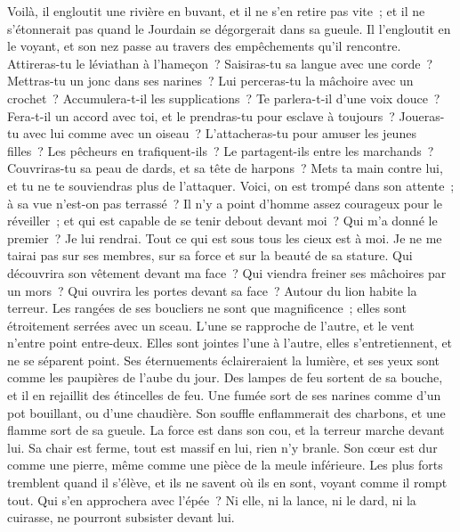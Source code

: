 \begin{multicols}{2}
Voilà, il engloutit une rivière en buvant, et il ne s'en retire pas vite~; et il ne s'étonnerait pas quand le Jourdain se dégorgerait dans sa gueule. 
Il l'engloutit en le voyant, et son nez passe au travers des empêchements qu'il rencontre. 
Attireras-tu le léviathan à l'hameçon~? Saisiras-tu sa langue avec une corde~?
Mettras-tu un jonc dans ses narines~? Lui perceras-tu la mâchoire avec un crochet~?
Accumulera-t-il les supplications~? Te parlera-t-il d'une voix douce~?
Fera-t-il un accord avec toi, et le prendras-tu pour esclave à toujours~? 
Joueras-tu avec lui comme avec un oiseau~? L'attacheras-tu pour amuser les jeunes filles~?
Les pêcheurs en trafiquent-ils~? Le partagent-ils entre les marchands~?
Couvriras-tu sa peau de dards, et sa tête de harpons~?
Mets ta main contre lui, et tu ne te souviendras plus de l'attaquer.
Voici, on est trompé dans son attente~; à sa vue n'est-on pas terrassé~?
\VerseOne{}Il n'y a point d'homme assez courageux pour le réveiller~; et qui est capable de se tenir debout devant moi~?
Qui m'a donné le premier~? Je lui rendrai. Tout ce qui est sous tous les cieux est à moi.
Je ne me tairai pas sur ses membres, sur sa force et sur la beauté de sa stature.
Qui découvrira son vêtement devant ma face~? Qui viendra freiner ses mâchoires par un mors~?
Qui ouvrira les portes devant sa face~? Autour du lion habite la terreur.
Les rangées de ses boucliers ne sont que magnificence~; elles sont étroitement serrées avec un sceau.
L'une se rapproche de l'autre, et le vent n'entre point entre-deux. 
Elles sont jointes l'une à l'autre, elles s'entretiennent, et ne se séparent point. 
Ses éternuements éclaireraient la lumière, et ses yeux sont comme les paupières de l'aube du jour. 
Des lampes de feu sortent de sa bouche, et il en rejaillit des étincelles de feu. 
Une fumée sort de ses narines comme d'un pot bouillant, ou d'une chaudière. 
Son souffle enflammerait des charbons, et une flamme sort de sa gueule. 
La force est dans son cou, et la terreur marche devant lui. 
Sa chair est ferme, tout est massif en lui, rien n'y branle. 
Son cœur est dur comme une pierre, même comme une pièce de la meule inférieure.
Les plus forts tremblent quand il s'élève, et ils ne savent où ils en sont, voyant comme il rompt tout. 
Qui s'en approchera avec l'épée~? Ni elle, ni la lance, ni le dard, ni la cuirasse, ne pourront subsister devant lui.

\end{multicols}
